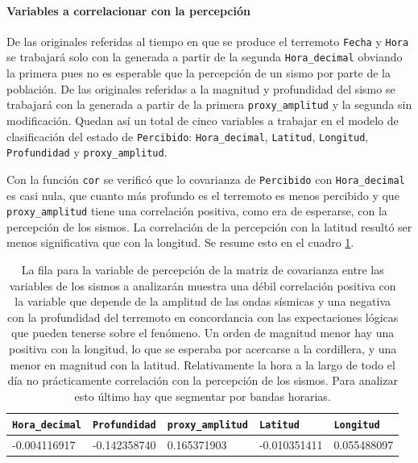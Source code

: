 \documentclass[a4paper]{report}
\begin{document}



\paragraph{Variables a correlacionar con la percepción}
De las originales referidas al tiempo en que se produce el terremoto \verb'Fecha' y \verb'Hora' se trabajará solo con la generada a partir de la segunda \verb'Hora_decimal' obviando la primera pues no es esperable que la percepción de un sismo por parte de la población.
De las originales referidas a la magnitud y profundidad del sismo se trabajará con la generada a partir de la primera \verb'proxy_amplitud' y la segunda sin modificación.
Quedan así un total de cinco variables a trabajar en el modelo de clasificación del estado de \verb'Percibido': \verb'Hora_decimal', \verb'Latitud', \verb'Longitud', \verb'Profundidad' y  \verb'proxy_amplitud'.

Con la función \verb'cor' se verificó que lo covarianza de \verb'Percibido' con \verb'Hora_decimal' es casi nula, que cuanto más profundo es el terremoto es menos percibido y que \verb'proxy_amplitud' tiene una correlación positiva, como era de esperarse, con la percepción de los sismos.
La correlación de la percepción con la latitud resultó ser menos significativa que con la longitud.
Se resume esto en el cuadro \ref{tab:correlaciones}.
\begin{table}[h]
	\centering
	\begin{tabular}{lllll}
		\toprule
		\verb'Hora_decimal' & \verb'Profundidad'  & \verb'proxy_amplitud' & \verb'Latitud' & \verb'Longitud' \\ 
		\midrule
		-0.004116917 & -0.142358740 & 0.165371903 & -0.010351411 & 0.055488097\\ \bottomrule
	\end{tabular}
	\caption{La fila para la variable de percepción de la matriz de covarianza entre las variables de los sismos a analizarán muestra una débil correlación positiva con la variable que depende de la amplitud de las ondas sísmicas y una negativa con la profundidad del terremoto en concordancia con las expectaciones lógicas que pueden tenerse sobre el fenómeno.
	Un orden de magnitud menor hay una positiva con la longitud, lo que se esperaba por acercarse a la cordillera, y una menor en magnitud con la latitud.
	Relativamente la hora a la largo de todo el día no prácticamente correlación con la percepción de los sismos.
	Para analizar esto último hay que segmentar por bandas horarias. 
}
\label{tab:correlaciones}
\end{table}
\end{document}
